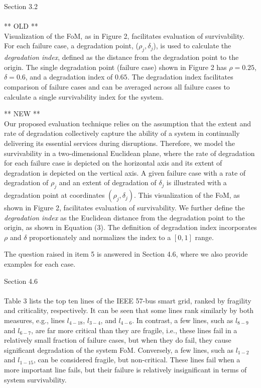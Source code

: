 \documentclass{article}
\newenvironment{response}{
  \doublespacing
  \setlength\parindent{0.05\linewidth}
  \ttfamily
}{}
\newenvironment{textblock}[1]
{\begin{tcolorbox}[breakable,enhanced]{#1 \\ \\}}
{\end{tcolorbox}}
\begin{document}
\begin{response}
\begin{textblock}{Section 3.2}
** OLD **\\
Visualization of the FoM, as in Figure 2, facilitates evaluation of survivability. For each failure case, a degradation point, ($\rho_j, \delta_j$), is used to calculate the \emph{degradation index}, defined as the distance from the degradation point to the origin. The single degradation point (failure case) shown in Figure 2 has $\rho = 0.25$, $\delta = 0.6$, and a degradation index of $0.65$. The degradation index facilitates comparison of failure cases and can be averaged across all failure cases to calculate a single survivability index for the system.

\vspace{1em}
** NEW **\\
Our proposed evaluation technique relies on the assumption that the extent and rate of degradation collectively capture the ability of a system in continually delivering its essential services during disruptions. Therefore, we model the survivability in a two-dimensional Euclidean plane, where the rate of degradation for each failure case is depicted on the horizontal axis and its extent of degradation is depicted on the vertical axis. A given failure case with a rate of degradation of $\rho_j$ and an extent of degradation of $\delta_j$ is illustrated with a degradation point at coordinates $(\rho_j, \delta_j)$. This visualization of the FoM, as shown in Figure 2, facilitates evaluation of survivability. We further define the \emph{degradation index} as the Euclidean distance from the degradation point to the origin, as shown in Equation (3). The definition of degradation index incorporates $\rho$ and $\delta$ proportionately and normalizes the index to a $[0, 1]$ range.
\end{textblock}

The question raised in item 5 is answered in Section 4.6, where we also provide examples for each case.

\begin{textblock}{Section 4.6}
Table 3 lists the top ten lines of the IEEE 57-bus smart grid, ranked by fragility and criticality, respectively. It can be seen that some lines rank similarly by both measures, e.g., lines $l_{4-18}$, $l_{3-4}$, and $l_{4-6}$. In contrast, a few lines, such as $l_{8-9}$ and $l_{6-7}$, are far more critical than they are fragile, i.e., these lines fail in a relatively small fraction of failure cases, but when they do fail, they cause significant degradation of the system FoM. Conversely, a few lines, such as $l_{1-2}$ and $l_{1-15}$, can be considered fragile, but non-critical. These lines fail when a more important line fails, but their failure is relatively insignificant in terms of system survivability.
\end{textblock}


\end{response}
\end{document}
